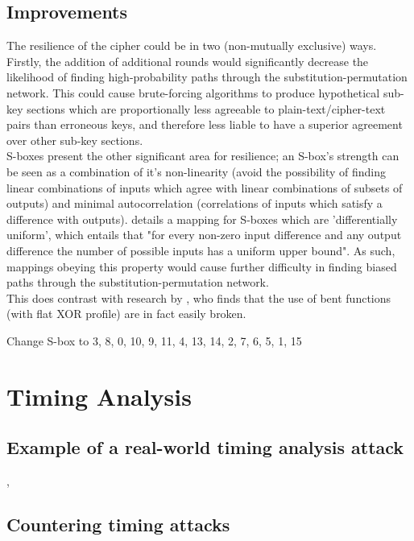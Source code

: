 \documentclass[british,11pt,a4paper]{article}
\begin{document}
\subsection{Improvements}
The resilience of the cipher could be in two (non-mutually exclusive) ways. Firstly, the addition of additional rounds would significantly decrease the likelihood of finding high-probability paths through the substitution-permutation network. This could cause brute-forcing algorithms to produce hypothetical sub-key sections which are proportionally less agreeable to plain-text/cipher-text pairs than erroneous keys, and therefore less liable to have a superior agreement over other sub-key sections.
\\  
S-boxes present the other significant area for resilience; an S-box's strength can be seen as a combination of it's non-linearity (avoid the possibility of finding linear combinations of inputs which agree with linear combinations of subsets of outputs) and minimal autocorrelation (correlations of inputs which satisfy a difference with outputs). \citet{nyberg} details a mapping for S-boxes which are 'differentially uniform', which entails that "for every non-zero input difference and any output difference the number of possible inputs has a uniform upper bound". As such, mappings obeying this property would cause further difficulty in finding biased paths through the substitution-permutation network.  
\\
This does contrast with research by \citet{Lawrence_Brown}, who finds that the use of bent functions (with flat XOR profile) are in fact easily broken. 



Change S-box to
3, 8, 0, 10, 9, 11, 4, 13, 14, 2, 7, 6, 5, 1, 15
\clearpage
\section{Timing Analysis}
\subsection{Example of a real-world timing analysis attack}
\cite{Kopf2009-mh},
\subsection{Countering timing attacks}
\end{document}
